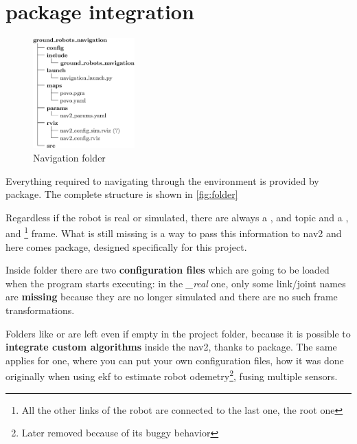 \section{ package integration}

\begin{figure}
    \includegraphics[width=0.35\textwidth]{images/nav_folder}
    \caption{Navigation folder}
\end{figure}

Everything required to navigating through the environment is provided by  package. The complete structure is shown in \autoref{fig:folder}


Regardless if the robot is real or simulated, there are always a ,  and  topic and a ,  and \footnote{All the other links of the robot are connected to the last one, the root one} frame. What is still missing is a way to pass this information to \acrshort{nav2} and here comes  package, designed specifically for this project.

Inside  folder there are two \textbf{configuration files} which are going to be loaded when the program starts executing: in the \textit{\_real} one, only some link/joint names are \textbf{missing} because they are no longer simulated and there are no such frame transformations. %

Folders like  or  are left even if empty in the project folder, because it is possible to \textbf{integrate custom algorithms} inside the \acrlong{nav2}, thanks to  package. The same applies for  one, where you can put your own configuration files, how it was done originally when using \acrfull{ekf} to estimate robot odemetry\footnote{Later removed because of its buggy behavior}, fusing multiple sensors.

